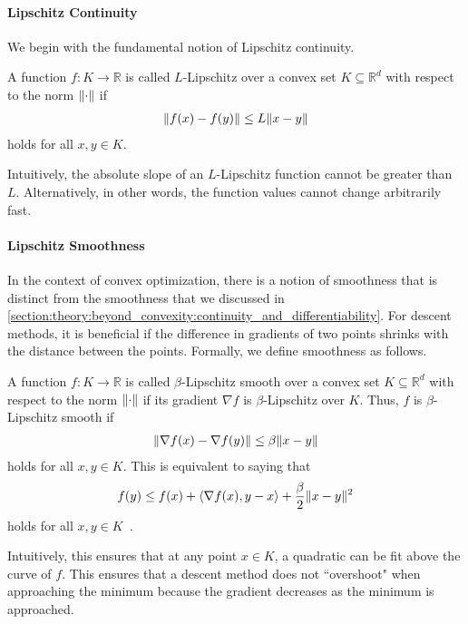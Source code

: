 \paragraph{Lipschitz Continuity} We begin with the fundamental notion of Lipschitz continuity.

\begin{definition}
\cite{Gupta2020} A function $f : K \to \mathbb{R}$ is called $L$-Lipschitz over a convex set $K \subseteq \mathbb{R}^d$ with respect to the norm $\lVert\cdot\rVert$ if \begin{align*}
    \lVert f(x) - f(y)\rVert \leq L \lVert x - y\rVert
\end{align*} holds for all $x, y \in K$.
\end{definition}

Intuitively, the absolute slope of an $L$-Lipschitz function cannot be greater than $L$. Alternatively, in other words, the function values cannot change arbitrarily fast.

\paragraph{Lipschitz Smoothness} In the context of convex optimization, there is a notion of smoothness that is distinct from the smoothness that we discussed in \cref{section:theory:beyond_convexity:continuity_and_differentiability}. For descent methods, it is beneficial if the difference in gradients of two points shrinks with the distance between the points. Formally, we define smoothness as follows.

\begin{definition}
A function $f : K \to \mathbb{R}$ is called $\beta$-Lipschitz smooth over a convex set $K \subseteq \mathbb{R}^d$ with respect to the norm $\lVert\cdot\rVert$ if its gradient $\nabla f$ is $\beta$-Lipschitz over $K$. Thus, $f$ is $\beta$-Lipschitz smooth if \begin{align*}
    \lVert\nabla f(x) - \nabla f(y)\rVert \leq \beta \lVert x - y\rVert
\end{align*} holds for all $x, y \in K$. This is equivalent to saying that \begin{align*}
    f(y) \leq f(x) + \langle\nabla f(x), y-x\rangle + \frac{\beta}{2}\lVert x-y\rVert^2
\end{align*} holds for all $x, y \in K$~\cite{Gupta2020}.
\end{definition}

Intuitively, this ensures that at any point $x \in K$, a quadratic can be fit above the curve of $f$. This ensures that a descent method does not ``overshoot" when approaching the minimum because the gradient decreases as the minimum is approached.


